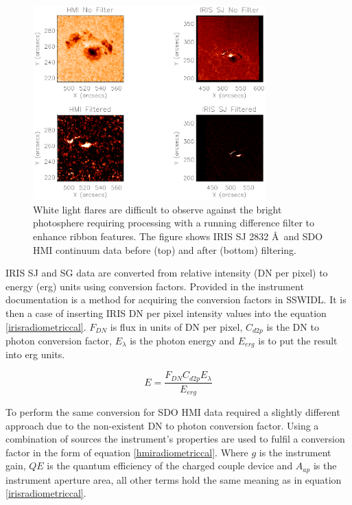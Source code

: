 \begin{figure}[H]
  \begin{center}
  \includegraphics[width=0.8\textwidth]{29-Mar-14-diff-examples}
  \end{center}
  \caption{White light flares are difficult to observe against the bright photosphere requiring processing with a running difference filter to enhance ribbon features. The figure shows IRIS SJ 2832 \AA\ and SDO HMI continuum data before (top) and after (bottom) filtering.}\label{dif_filter}
\end{figure}

IRIS SJ and SG data are converted from relative intensity (DN per pixel) to energy (erg) units using conversion factors. Provided in the instrument documentation \citep{2014SoPh..289.2733D} is a method for acquiring the conversion factors in SSWIDL. It is then a case of inserting IRIS DN per pixel intensity values into the equation \ref{irisradiometriccal}. $F_{DN}$ is flux in units of DN per pixel, $C_{d2p}$ is the DN to photon conversion factor, $E_{\lambda}$ is the photon energy and $E_{erg}$ is to put the result into erg units.  

\begin{equation}\label{irisradiometriccal}
E = \frac{F_{DN}  C_{d2p} E_{\lambda}}{E_{erg}}
\end{equation}

To perform the same conversion for SDO HMI data required a slightly different approach due to the non-existent DN to photon conversion factor. Using a combination of sources \citep{2012SoPh..275...41B, 2012SoPh..275..285C} the instrument's properties are used to fulfil a conversion factor in the form of equation \ref{hmiradiometriccal}. Where $g$ is the instrument gain, $QE$ is the quantum efficiency of the charged couple device and $A_{ap}$ is the instrument aperture area, all other terms hold the same meaning as in equation \ref{irisradiometriccal}.

